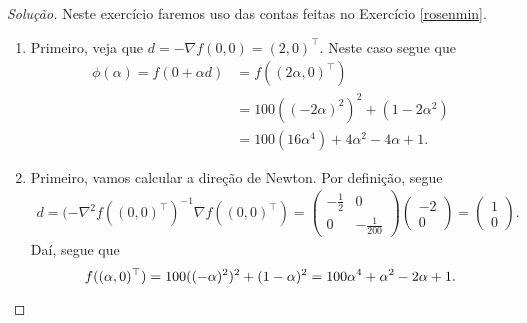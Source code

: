 \documentclass[12pt,twoside,a4paper]{article}
\begin{document}
\begin{proof}[Solução]
  Neste exercício faremos uso das contas feitas no
  Exercício \ref{rosenmin}.
  \begin{enumerate}
  \item Primeiro, veja que \(d=-\nabla f(0,0)=(2,0)^\top\). Neste caso
    segue que
    \begin{align*}
      \phi(\alpha)=f(0+\alpha d)&=f((2\alpha,0)^\top)\\&=
      100((-2\alpha)^2)^2+(1-2\alpha^2)\\&=
      100(16\alpha^4)+4\alpha^2-4\alpha + 1.
    \end{align*}
  \item Primeiro, vamos calcular a direção de Newton. Por definição, segue
    \begin{align*}
      d= (-\nabla^2f((0,0)^\top)^{-1}\nabla f((0,0)^\top)=\begin{pmatrix}
        -\frac{1}{2} & 0 \\ 0 & -\frac{1}{200}\end{pmatrix}\begin{pmatrix}
        -2 \\ 0 
      \end{pmatrix}=\begin{pmatrix}1 \\ 0\end{pmatrix}.
    \end{align*}
    Daí, segue que
    \[f((\alpha,0)^\top)=100((-\alpha)^2)^2+(1-\alpha)^2= 100\alpha^4+\alpha^2-2\alpha+1.\qedhere\]
  \end{enumerate}
\end{proof}
\end{document}
